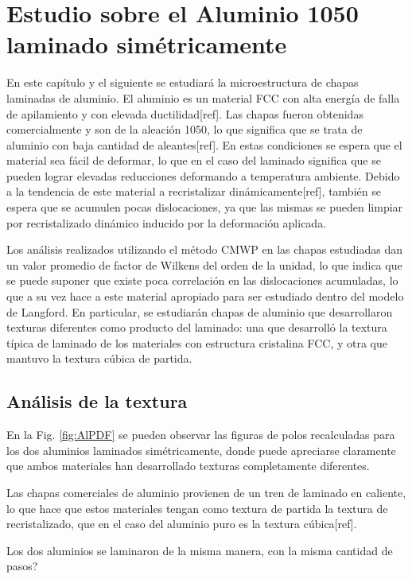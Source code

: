 \chapter{Estudio sobre el Aluminio 1050 laminado simétricamente}\label{C:AlS}
\graphicspath{{./figs/06_Al/}}

En este capítulo y el siguiente se estudiará la microestructura de chapas laminadas de aluminio.
El aluminio es un material FCC con alta energía de falla de apilamiento y con elevada ductilidad[ref].
Las chapas fueron obtenidas comercialmente y son de la aleación 1050, lo que significa que se trata de aluminio con baja cantidad de aleantes[ref].
En estas condiciones se espera que el material sea fácil de deformar, lo que en el caso del laminado significa que se pueden lograr elevadas reducciones deformando a temperatura ambiente.
Debido a la tendencia de este material a recristalizar dinámicamente[ref], también se espera que se acumulen pocas dislocaciones, ya que las mismas se pueden limpiar por recristalizado dinámico inducido por la deformación aplicada.

Los análisis realizados utilizando el método CMWP en las chapas estudiadas dan un valor promedio de factor de Wilkens del orden de la unidad, lo que indica que se puede suponer que existe poca correlación en las dislocaciones acumuladas, lo que a su vez hace a este material apropiado para ser estudiado dentro del modelo de Langford.
En particular, se estudiarán chapas de aluminio que desarrollaron texturas diferentes como producto del laminado: una que desarrolló la textura típica de laminado de los materiales con estructura cristalina FCC, y otra que mantuvo la textura cúbica de partida.

\section{Análisis de la textura}\label{S:AlText}
En la Fig. \ref{fig:AlPDF} se pueden observar las figuras de polos recalculadas para los dos aluminios laminados simétricamente, donde puede apreciarse claramente que ambos materiales han desarrollado texturas completamente diferentes.

Las chapas comerciales de aluminio provienen de un tren de laminado en caliente, lo que hace que estos materiales tengan como textura de partida la textura de recristalizado, que en el caso del aluminio puro es la textura cúbica[ref].

Los dos aluminios se laminaron de la misma manera, con la misma cantidad de pasos?

